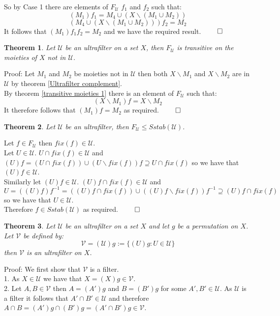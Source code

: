 \documentclass{report}
\newtheorem{theorem}{Theorem}[section]
\begin{document}
    So by Case 1 there are elements of $F_{\mathcal{U}}$ $f_1$ and $f_2$ such that:
    $$(M_1)f_1 = M_4 \cup (X \backslash  (M_1 \cup M_2))$$
    $$( M_4 \cup (X \backslash  (M_1 \cup M_2)))f_2 = M_2$$
    It follows that $(M_1)f_1f_2 = M_2$ and we have the required result.
     $\qed$
\begin{theorem}\label{transitive moieties 2}
Let $\mathcal{U}$ be an ultrafilter on a set $X$, then $F_{\mathcal{U}}$ is transitive on the moieties of $X$ not in $\mathcal{U}$.
\end{theorem}\par
Proof: Let $M_1$ and $M_2$ be moieties not in $\mathcal{U}$ then both $X \backslash  M_1$ and  $X \backslash  M_2$ are in $\mathcal{U}$ by theorem \ref{Ultrafilter complement}.\\ By theorem \ref{transitive moieties 1} there is an element of $F_{\mathcal{U}}$ such that:
$$(X \backslash  M_1)f = X \backslash  M_2$$
It therefore follows that $(M_1)f = M_2$ as required. $\qed$
\begin{theorem}\label{Ultrasubgroup}
Let $\mathcal{U}$ be an ultrafilter, then $F_{\mathcal{U}} \leq Sstab(\mathcal{U})$.
\end{theorem}
Let $f \in F_{\mathcal{U}}$ then $fix(f)\in \mathcal{U}$.\\
Let $U \in \mathcal{U}$. $U\cap fix(f) \in \mathcal{U}$ and $(U)f =(U\cap fix(f))\cup (U \backslash  fix(f))f \supseteq U\cap fix(f)$ so we have that $(U)f \in \mathcal{U}$.\\
Similarly let $(U)f \in \mathcal{U}$. $(U)f\cap fix(f) \in \mathcal{U}$ and $U =((U)f)f^{-1}=((U)f\cap fix(f))\cup ((U)f \backslash  fix(f))f^{-1} \supseteq (U)f\cap fix(f)$ so we have that $U \in \mathcal{U}$.\\
Therefore $f \in Sstab(\mathcal{U})$ as required. $\qed$
\begin{theorem}\label{ultrafilter movement}
Let $\mathcal{U}$ be an ultrafilter on a set $X$ and let $g$ be a permutation on $X$. Let $\mathcal{V}$ be defined by:
$$\mathcal{V} = (\mathcal{U})g := \{(U)g:U \in \mathcal{U}\}$$
then $\mathcal{V}$ is an ultrafilter on $X$.
\end{theorem}\par
Proof: We first show that $\mathcal{V}$ is a filter.\\
1. As $X \in \mathcal{U}$ we have that $X = (X)g \in \mathcal{V}$.\\
2. Let $A,B \in \mathcal{V}$ then $A = (A')g$ and $B= (B')g$ for some $A',B'\in \mathcal{U}$. As $\mathcal{U}$ is a filter it follows that $A'\cap B' \in \mathcal{U}$ and therefore $A\cap B= (A')g \cap (B')g = (A'\cap B')g \in \mathcal{V}$.\\
\end{document}

